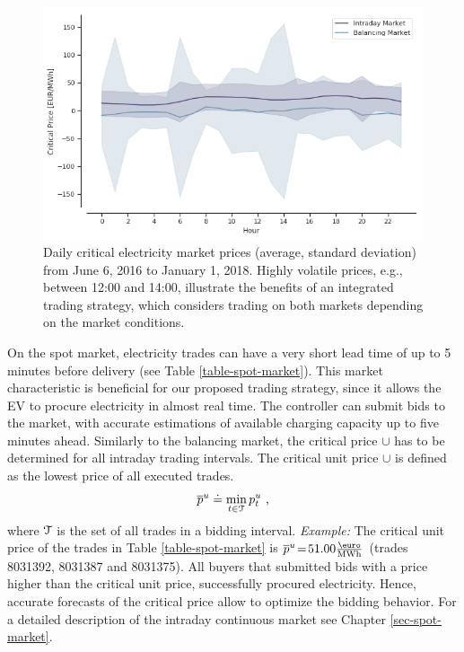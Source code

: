 \documentclass[a4paper, 12pt]{article}
\begin{document}
\begin{figure}[hp]
\centering
\includegraphics[width=1\linewidth]{fig/critical-prices.png}
\caption[Critical electricity prices]{Daily critical electricity market prices (average, standard deviation) from June 6, 2016 to January 1, 2018. Highly volatile prices, e.g., between 12:00 and 14:00, illustrate the benefits of an integrated trading strategy, which considers trading on both markets depending on the market conditions.}
\end{figure}

On the spot market, electricity trades can have a very short lead time of up to
5 minutes before delivery (see Table \ref{table-spot-market}). This market
characteristic is beneficial for our proposed trading strategy, since it allows
the EV to procure electricity in almost real time. The controller can submit
bids to the market, with accurate estimations of available charging capacity up
to five minutes ahead. Similarly to the balancing market, the critical price
\(\cup{}\) has to be determined for all intraday trading intervals. The critical
unit price \(\cup{}\) is defined as the lowest price of all executed trades.
\begin{equation*}
    \overline p^u_{} \doteq \min_{t \in \cal{T}} p^u_{t} \text{ ,}
\end{equation*}
where \(\cal{T}\) is the set of all trades in a bidding interval. \emph{Example:} The
critical unit price of the trades in Table \ref{table-spot-market} is \(\cup{}
\!=\!51.00 \emwh\) (trades 8031392, 8031387 and 8031375). All buyers that submitted
bids with a price higher than the critical unit price, successfully procured
electricity. Hence, accurate forecasts of the critical price allow to optimize the
bidding behavior. For a detailed description of the intraday continuous market
see Chapter \ref{sec-spot-market}.
\end{document}
